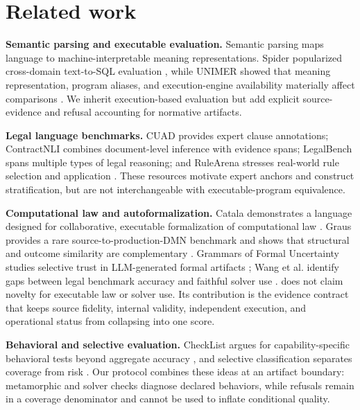 \section{Related work}

\textbf{Semantic parsing and executable evaluation.}
Semantic parsing maps language to machine-interpretable meaning
representations. Spider popularized cross-domain text-to-SQL evaluation
\citep{yu2018spider}, while UNIMER showed that meaning representation, program
aliases, and execution-engine availability materially affect comparisons
\citep{guo2020unimer}. We inherit execution-based evaluation but add explicit
source-evidence and refusal accounting for normative artifacts.

\textbf{Legal language benchmarks.}
CUAD provides expert clause annotations; ContractNLI combines document-level
inference with evidence spans; LegalBench spans multiple types of legal
reasoning; and RuleArena stresses real-world rule selection and application
\citep{hendrycks2021cuad,koreeda2021contractnli,guha2023legalbench,zhou2025rulearena}.
These resources motivate expert anchors and construct stratification, but are
not interchangeable with executable-program equivalence.

\textbf{Computational law and autoformalization.}
Catala demonstrates a language designed for collaborative, executable
formalization of computational law \citep{merigoux2021catala}. Graus provides
a rare source-to-production-DMN benchmark and shows that structural and outcome
similarity are complementary \citep{graus2026legaltext}. Grammars of Formal
Uncertainty studies selective trust in LLM-generated formal artifacts
\citep{ganguly2025grammars}; Wang et al. identify gaps between legal benchmark
accuracy and faithful solver use \citep{wang2026limits}. \lexec{} does not claim
novelty for executable law or solver use. Its contribution is the evidence
contract that keeps source fidelity, internal validity, independent execution,
and operational status from collapsing into one score.

\textbf{Behavioral and selective evaluation.}
CheckList argues for capability-specific behavioral tests beyond aggregate
accuracy \citep{ribeiro2020checklist}, and selective classification separates
coverage from risk \citep{geifman2017selective}. Our protocol combines these
ideas at an artifact boundary: metamorphic and solver checks diagnose declared
behaviors, while refusals remain in a coverage denominator and cannot be used
to inflate conditional quality.
